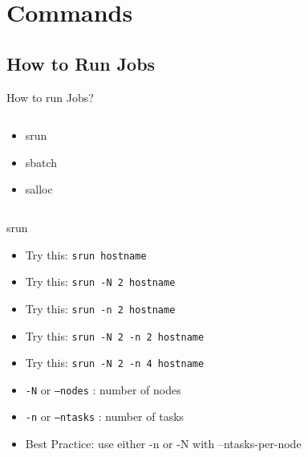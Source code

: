 \documentclass[10pt,compress]{beamer}
\begin{document}
\section{Commands}
\subsection{How to Run Jobs}

\begin{frame}{How to run Jobs?}



\begin{columns}[c]
        \begin{center}
          \begin{itemize} \setlength{\itemsep}{1.5em}%
  \item srun
  \item sbatch
  \item salloc
\end{itemize}
        \end{center}
        \begin{center}
        \end{center}
\end{columns}

\end{frame}

\begin{frame}{srun}
\begin{itemize} \setlength{\itemsep}{1.5em}%
  \pause
  \item Try this: \texttt{srun hostname}
  \pause
  \item Try this:  \texttt{srun -N 2 hostname}
  \pause
  \item Try this:  \texttt{srun -n 2 hostname}
  \pause
  \item Try this:  \texttt{srun -N 2 -n 2 hostname}
  \pause
  \item Try this:  \texttt{srun -N 2 -n 4 hostname}
  \pause
  \item  \texttt{-N} or \texttt {--nodes} : number of nodes
  \pause
  \item  \texttt{-n} or \texttt{--ntasks} : number of tasks
  \pause
  \item Best Practice: use either {-n or -N} with --ntasks-per-node
  \end{itemize}
\end{frame}
\end{document}
